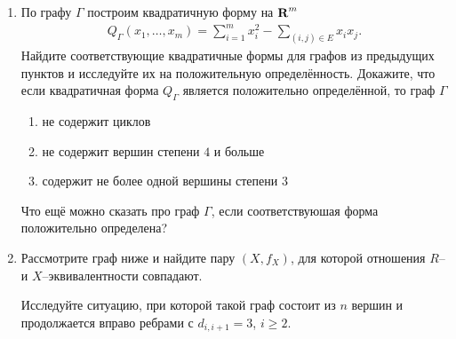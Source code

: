 \begin{enumerate}
\begin{enumerate}
\begin{center}
\end{center}
\end{enumerate}

\item По графу $\Gamma$ построим квадратичную форму на $\text{\bfseries R}^m$
\begin{align*}
Q_\Gamma(x_1, \ldots, x_m) = \sum_{i=1}^m x_i^2 - \sum_{(i,j)\in E} x_i x_j.
\end{align*}
Найдите соответствующие квадратичные формы для графов из предыдущих пунктов и исследуйте их на положительную определённость. Докажите, что если квадратичная форма $Q_\Gamma$ является положительно определённой, то граф $\Gamma$
\begin{enumerate}
\item не содержит циклов
\item не содержит вершин степени $4$ и больше
\item содержит не более одной вершины степени $3$
\end{enumerate}
Что ещё можно сказать про граф $\Gamma$, если соответствуюшая форма положительно определена?
\item Рассмотрите граф ниже и найдите пару $(X,f_X)$, для которой отношения $R$-- и $X$--эквивалентности совпадают.
\begin{center}
\end{center}
Исследуйте ситуацию, при которой такой граф состоит из $n$ вершин и продолжается вправо ребрами с $d_{i,i+1} = 3$, $i \geq 2$.
\end{enumerate}